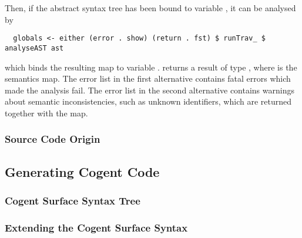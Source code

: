 Then, if the abstract syntax tree has been bound to variable , it can be analysed by
\begin{verbatim}
  globals <- either (error . show) (return . fst) $ runTrav_ $ analyseAST ast
\end{verbatim}
which binds the resulting map to variable . 
returns a result of type , where 
is the semantics map. The error list in the first alternative contains fatal errors which made the analysis fail. 
The error list in the second alternative contains warnings about semantic inconsistencies, such as unknown identifiers,
which are returned together with the map. 

\subsubsection{Source Code Origin}

\subsection{Generating Cogent Code}

\subsubsection{Cogent Surface Syntax Tree}

\subsubsection{Extending the Cogent Surface Syntax}
